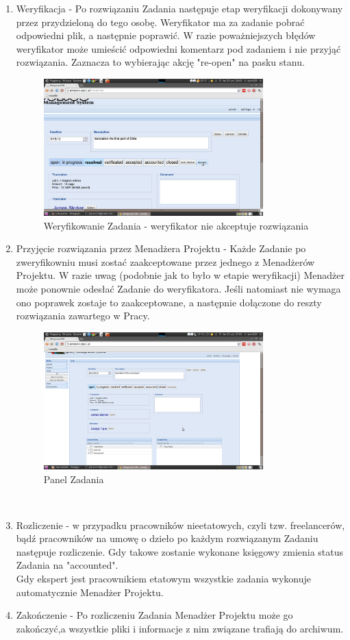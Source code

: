 \documentclass[licencjacka]{pracamgr}
\begin{document}
\begin{enumerate}
\item Weryfikacja - Po rozwiązaniu Zadania następuje etap weryfikacji dokonywany przez przydzieloną do tego osobę. Weryfikator ma za zadanie pobrać odpowiedni plik, a następnie poprawić. W razie poważniejszych błędów weryfikator może umieścić odpowiedni komentarz pod zadaniem i nie przyjąć rozwiązania. Zaznacza to wybierając akcję "re-open" na pasku stanu.	
\begin{figure}[ht!]
\centering
\includegraphics[width=0.8\textwidth]{resources/task_reopen.png}
\caption{Weryfikowanie Zadania - weryfikator nie akceptuje rozwiązania}
\end{figure}
\item 	Przyjęcie rozwiązania przez Menadżera Projektu - Każde Zadanie po zweryfikowniu musi zostać zaakceptowane przez jednego z Menadżerów Projektu. W razie uwag (podobnie jak to było w etapie weryfikacji) Menadżer może ponownie odesłać Zadanie do weryfikatora. Jeśli natomiast nie wymaga ono poprawek zostaje to zaakceptowane, a następnie dołączone do reszty rozwiązania zawartego w Pracy.
\begin{figure}[ht!]
\centering
\includegraphics[width=0.8\textwidth]{resources/task.png}
\caption{Panel Zadania}
\end{figure}
\\
\item Rozliczenie - w przypadku pracowników nieetatowych, czyli tzw. freelancerów, bądź pracowników na umowę o dzieło po każdym rozwiązanym Zadaniu następuje rozliczenie. Gdy takowe zostanie wykonane księgowy zmienia status Zadania na "accounted".\\
Gdy ekspert jest pracownikiem etatowym wszystkie zadania wykonuje automatycznie Menadżer Projektu.
\item Zakończenie - Po rozliczeniu Zadania Menadżer Projektu może go zakończyć,a wszystkie pliki i informacje z nim związane trafiają do archiwum. 
\end{enumerate}
\end{document}
